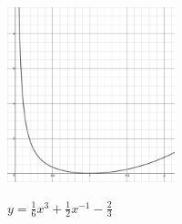 \documentclass{ximera}
\begin{document}
\begin{enumerate}
\begin{enumerate}
\begin{center} 

\includegraphics[height=2in]{./PowerFunctionsGraphics/PURSUIT02.jpg}

 $y = \frac{1}{6}x^3+\frac{1}{2}x^{-1} - \frac{2}{3}$

\end{center}


\end{enumerate}






\setcounter{HW}{\value{enumi}}
\end{enumerate}
\end{document}
